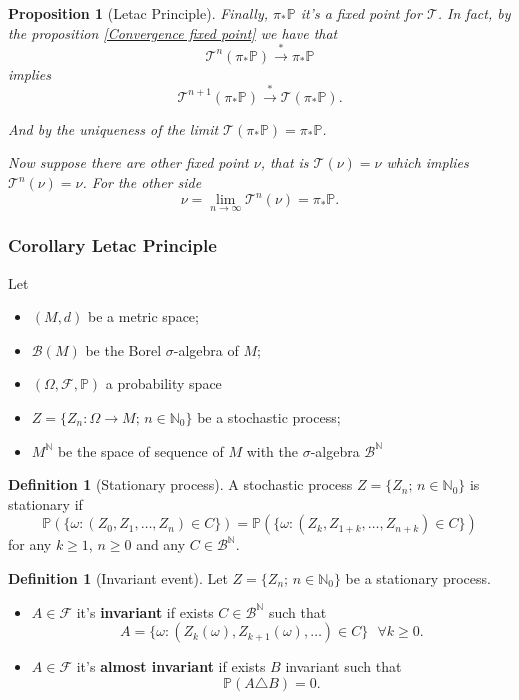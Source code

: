 \documentclass[a4paper]{article}
\theoremstyle{plain}
\newtheorem{prop} [theorem]{Proposition}
\theoremstyle{definition}
\newtheorem{defn}[theorem]{Definition}%
\begin{document}
\begin{prop}[Letac Principle]
    Finally, $\pi_*\mathbb{P}$ it's a fixed point for $\mathcal{T}$. In fact, by the proposition \ref{Convergence fixed point} we have that 
    $$\mathcal{T}^n (\pi_*\mathbb{P}) \overset{*}{\to} \pi_*\mathbb{P}$$ 
    implies 
    $$\mathcal{T}^{n+1} (\pi_*\mathbb{P}) \overset{*}{\to} \mathcal{T}(\pi_*\mathbb{P}).$$

    And by the uniqueness of the limit $\mathcal{T}(\pi_*\mathbb{P}) = \pi_*\mathbb{P}$.

    Now suppose there are other fixed point $\nu$, that is $\mathcal{T}(\nu) = \nu$ which implies $\mathcal{T}^n(\nu) = \nu$. For the other side 
    $$\nu =  \lim_{n \to \infty} \mathcal{T}^n(\nu) = \pi_*\mathbb{P}.$$
    \end{prop}

        \subsubsection*{Corollary Letac Principle}
  
       Let 
    \begin{itemize}
        \item $(M,d)$ be a metric space;
        \item $\mathcal{B}(M)$ be the Borel $\sigma$-algebra of $M$;
        \item $(\Omega, \mathcal{F}, \mathbb{P})$ a probability space
        \item $Z = \{Z_{n}: \Omega\to M;\, n \in \mathbb{N}_0\}$ be a stochastic process;
        \item $M^{\mathbb{N}}$ be the space of sequence of $M$ with the $\sigma$-algebra $\mathcal{B}^{\mathbb{N}}$
    \end{itemize}

    \begin{defn}[Stationary process] A stochastic process $Z = \{Z_{n};\, n \in \mathbb{N}_0\}$ is stationary if 
    $$ \mathbb P (\{\omega : (Z_0,Z_1, \dots,Z_n ) \in C\}) = \mathbb P (\{\omega : (Z_k,Z_{1+k}, \dots,Z_{n+k} ) \in C\})$$
for any $k\geq 1$, $n \geq 0$ and any $C \in  \mathcal{B}^{\mathbb{N}}$.
    \end{defn}

    
    \begin{defn}[Invariant event] Let $Z = \{Z_{n};\, n \in \mathbb{N}_0\}$ be a stationary process.
    \begin{itemize}
        \item $A \in \mathcal{F}$ it's \textbf{invariant} if exists $C \in \mathcal{B}^{\mathbb{N}}$ such that 
        $$ A = \{\omega : ( Z_k(\omega),Z_{k+1}(\omega), \dots  ) \in C\}\,\,\,\, \forall k \geq 0.$$

        \item $A \in \mathcal{F}$ it's \textbf{almost invariant} if exists $B$ invariant such that 
        $$\mathbb P(A \triangle B) = 0.$$
    \end{itemize}
    \end{defn}
\end{document}
